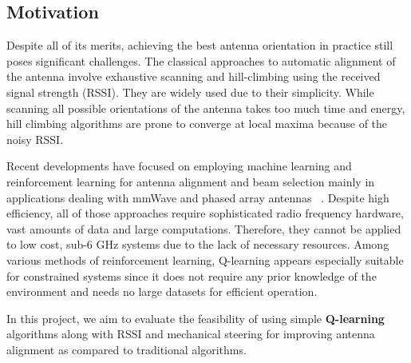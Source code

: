 \subsection{Motivation}

Despite all of its merits, achieving the best antenna orientation in practice still poses significant challenges. The classical approaches to automatic alignment of the antenna involve exhaustive scanning and hill-climbing using the received signal strength (RSSI). They are widely used due to their simplicity. While scanning all possible orientations of the antenna takes too much time and energy, hill climbing algorithms are prone to converge at local maxima because of the noisy RSSI.

Recent developments have focused on employing machine learning and reinforcement learning for antenna alignment and beam selection mainly in applications dealing with mmWave and phased array antennas ~\cite{ref1,ref2}. Despite high efficiency, all of those approaches require sophisticated radio frequency hardware, vast amounts of data and large computations. Therefore, they cannot be applied to low cost, sub-6 GHz systems due to the lack of necessary resources. Among various methods of reinforcement learning, Q-learning appears especially suitable for constrained systems since it does not require any prior knowledge of the environment and needs no large datasets for efficient operation.

In this project, we aim to evaluate the feasibility of using simple \textbf{Q-learning} algorithms along with RSSI and mechanical steering for improving antenna alignment as compared to traditional algorithms.